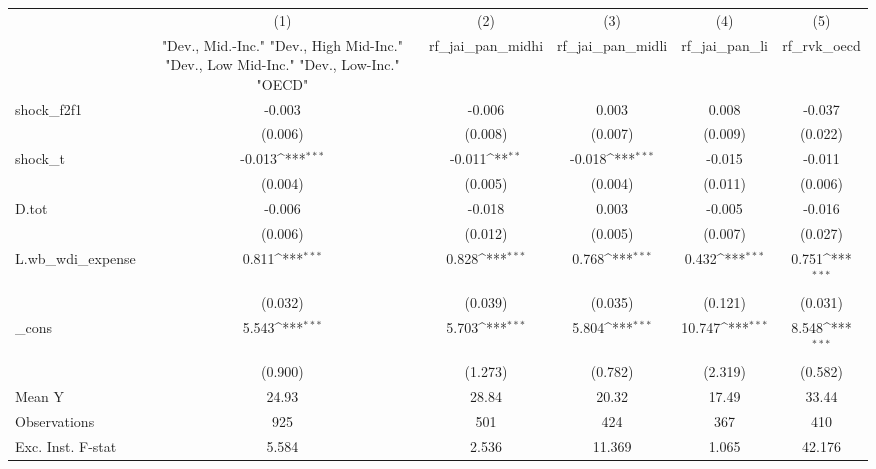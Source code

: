 {
\def\sym#1{\ifmmode^{#1}\else\(^{#1}\)\fi}
\begin{tabular}{l*{5}{c}}
\toprule
            &\multicolumn{1}{c}{(1)}&\multicolumn{1}{c}{(2)}&\multicolumn{1}{c}{(3)}&\multicolumn{1}{c}{(4)}&\multicolumn{1}{c}{(5)}\\
            &\multicolumn{1}{c}{ "Dev., Mid.-Inc." "Dev., High Mid-Inc." "Dev., Low Mid-Inc." "Dev., Low-Inc." "OECD" }&\multicolumn{1}{c}{rf\_jai\_pan\_midhi}&\multicolumn{1}{c}{rf\_jai\_pan\_midli}&\multicolumn{1}{c}{rf\_jai\_pan\_li}&\multicolumn{1}{c}{rf\_rvk\_oecd}\\
\midrule
shock\_f2f1  &      -0.003         &      -0.006         &       0.003         &       0.008         &      -0.037         \\
            &     (0.006)         &     (0.008)         &     (0.007)         &     (0.009)         &     (0.022)         \\
\addlinespace
shock\_t     &      -0.013\sym{***}&      -0.011\sym{**} &      -0.018\sym{***}&      -0.015         &      -0.011         \\
            &     (0.004)         &     (0.005)         &     (0.004)         &     (0.011)         &     (0.006)         \\
\addlinespace
D.tot       &      -0.006         &      -0.018         &       0.003         &      -0.005         &      -0.016         \\
            &     (0.006)         &     (0.012)         &     (0.005)         &     (0.007)         &     (0.027)         \\
\addlinespace
L.wb\_wdi\_expense&       0.811\sym{***}&       0.828\sym{***}&       0.768\sym{***}&       0.432\sym{***}&       0.751\sym{***}\\
            &     (0.032)         &     (0.039)         &     (0.035)         &     (0.121)         &     (0.031)         \\
\addlinespace
\_cons      &       5.543\sym{***}&       5.703\sym{***}&       5.804\sym{***}&      10.747\sym{***}&       8.548\sym{***}\\
            &     (0.900)         &     (1.273)         &     (0.782)         &     (2.319)         &     (0.582)         \\
\midrule
Mean Y      &       24.93         &       28.84         &       20.32         &       17.49         &       33.44         \\
Observations&         925         &         501         &         424         &         367         &         410         \\
Exc. Inst. F-stat&       5.584         &       2.536         &      11.369         &       1.065         &      42.176         \\
\bottomrule
\end{tabular}
}
